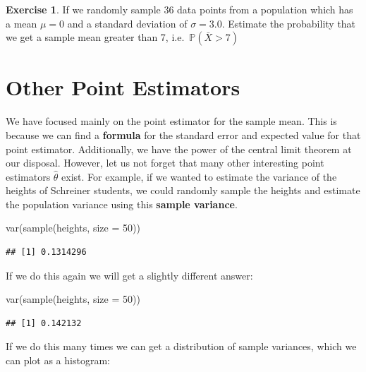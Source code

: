 \documentclass[
]{book}
\newenvironment{Shaded}{\begin{snugshade}}{\end{snugshade}}
\newcommand{\AttributeTok}[1]{\textcolor[rgb]{0.77,0.63,0.00}{#1}}
\newcommand{\DecValTok}[1]{\textcolor[rgb]{0.00,0.00,0.81}{#1}}
\newcommand{\FunctionTok}[1]{\textcolor[rgb]{0.00,0.00,0.00}{#1}}
\newcommand{\NormalTok}[1]{#1}
\theoremstyle{definition}
\theoremstyle{definition}
\theoremstyle{definition}
\newtheorem{exercise}{Exercise}[chapter]
\theoremstyle{definition}
\theoremstyle{remark}
\begin{document}
\begin{exercise}
\protect\hypertarget{exr:unnamed-chunk-341}{}\label{exr:unnamed-chunk-341}If we randomly sample 36 data points from a population which has a mean \(\mu=0\) and a standard deviation of \(\sigma=3.0\). Estimate the probability that we get a sample mean greater than 7, i.e.~\(\mathbb{P}(\bar{X}>7)\)
\end{exercise}

\hypertarget{other-point-estimators}{%
\section{Other Point Estimators}\label{other-point-estimators}}

We have focused mainly on the point estimator for the sample mean. This is because we can find a \textbf{formula} for the standard error and expected value for that point estimator. Additionally, we have the power of the central limit theorem at our disposal. However, let us not forget that many other interesting point estimators \(\hat{\theta}\) exist. For example, if we wanted to estimate the variance of the heights of Schreiner students, we could randomly sample the heights and estimate the population variance using this \textbf{sample variance}.

\begin{Shaded}
\begin{Highlighting}[]
\FunctionTok{var}\NormalTok{(}\FunctionTok{sample}\NormalTok{(heights, }\AttributeTok{size =} \DecValTok{50}\NormalTok{))}
\end{Highlighting}
\end{Shaded}

\begin{verbatim}
## [1] 0.1314296
\end{verbatim}

If we do this again we will get a slightly different answer:

\begin{Shaded}
\begin{Highlighting}[]
\FunctionTok{var}\NormalTok{(}\FunctionTok{sample}\NormalTok{(heights, }\AttributeTok{size =} \DecValTok{50}\NormalTok{))}
\end{Highlighting}
\end{Shaded}

\begin{verbatim}
## [1] 0.142132
\end{verbatim}

If we do this many times we can get a distribution of sample variances, which we can plot as a histogram:
\end{document}
